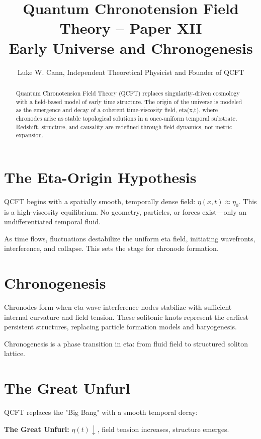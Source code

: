 \documentclass[12pt]{article}
\title{Quantum Chronotension Field Theory – Paper XII\\Early Universe and Chronogenesis}
\author{Luke W. Cann, Independent Theoretical Physicist and Founder of QCFT}
\date{}
\begin{document}
\maketitle

\begin{abstract}
Quantum Chronotension Field Theory (QCFT) replaces singularity-driven cosmology with a field-based model of early time structure. The origin of the universe is modeled as the emergence and decay of a coherent time-viscosity field, eta(x,t), where chronodes arise as stable topological solutions in a once-uniform temporal substrate. Redshift, structure, and causality are redefined through field dynamics, not metric expansion.
\end{abstract}

\section{The Eta-Origin Hypothesis}

QCFT begins with a spatially smooth, temporally dense field: $ \eta(x,t) \approx \eta_0 $. This is a high-viscosity equilibrium. No geometry, particles, or forces exist—only an undifferentiated temporal fluid.

As time flows, fluctuations destabilize the uniform eta field, initiating wavefronts, interference, and collapse. This sets the stage for chronode formation.

\section{Chronogenesis}

Chronodes form when eta-wave interference nodes stabilize with sufficient internal curvature and field tension. These solitonic knots represent the earliest persistent structures, replacing particle formation models and baryogenesis.

Chronogenesis is a phase transition in eta: from fluid field to structured soliton lattice.

\section{The Great Unfurl}

QCFT replaces the "Big Bang" with a smooth temporal decay:

\begin{center}
\textbf{The Great Unfurl:} $ \eta(t) \downarrow $, field tension increases, structure emerges.
\end{center}
\end{document}
